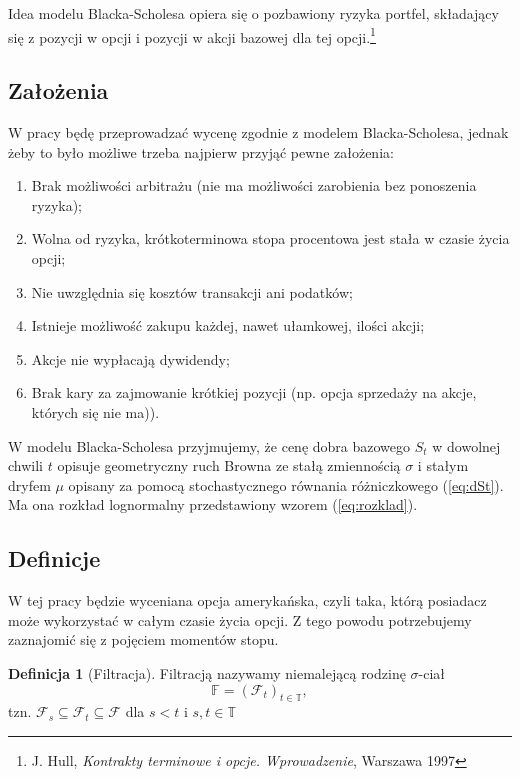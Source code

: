 \documentclass[]{pwr_wmat_praca_dyplomowa}
\theoremstyle{plain}
\numberwithin{theorem}{chapter}
\theoremstyle{definition}
\numberwithin{theorem}{chapter}
\newtheorem{definition}[theorem]{Definicja}
\begin{document}
Idea modelu Blacka-Scholesa opiera się o pozbawiony ryzyka portfel, składający się z pozycji w opcji i pozycji w akcji bazowej dla tej opcji.\footnote{J. Hull, \textit{Kontrakty terminowe i opcje. Wprowadzenie}, Warszawa 1997}

\subsection{Założenia}

W pracy będę przeprowadzać wycenę zgodnie z modelem Blacka-Scholesa, jednak żeby to było możliwe trzeba najpierw przyjąć pewne założenia: 

\begin{enumerate}
\item Brak możliwości arbitrażu (nie ma możliwości zarobienia bez ponoszenia ryzyka);
\item Wolna od ryzyka, krótkoterminowa stopa procentowa jest stała w czasie życia opcji;
\item Nie uwzględnia się kosztów transakcji ani podatków;
\item Istnieje możliwość zakupu każdej, nawet ułamkowej, ilości akcji;
\item Akcje nie wypłacają dywidendy;
\item Brak kary za zajmowanie krótkiej pozycji (np. opcja sprzedaży na akcje, których się nie ma)).
\end{enumerate}
W modelu Blacka-Scholesa przyjmujemy, że cenę dobra bazowego $S_t$ w dowolnej chwili $t$ opisuje geometryczny ruch Browna ze stałą zmiennością $\sigma$ i  stałym dryfem $\mu$ opisany za pomocą stochastycznego równania różniczkowego (\ref{eq:dSt}). Ma ona rozkład lognormalny przedstawiony wzorem (\ref{eq:rozklad}).

\subsection{Definicje}
W tej pracy będzie wyceniana opcja amerykańska, czyli taka, którą posiadacz może wykorzystać w całym czasie życia opcji. Z tego powodu potrzebujemy zaznajomić się z pojęciem momentów stopu.

\begin{definition}[Filtracja]
Filtracją nazywamy niemalejącą rodzinę $\sigma$-ciał
$$\mathbb{F} = (\mathcal{F}_t)_{t \in \mathbb{T}},$$
tzn. $\mathcal{F}_s \subseteq \mathcal{F}_t \subseteq \mathcal{F}$ dla $s<t$ i $s,t \in \mathbb{T}$
\end{definition}
\end{document}
